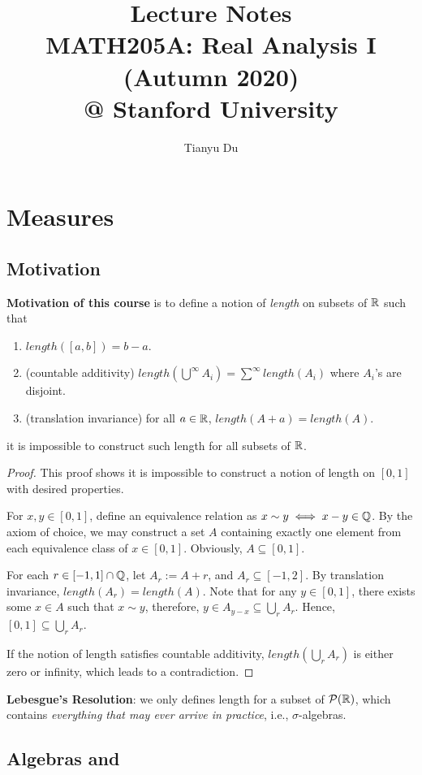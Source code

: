 \documentclass[11pt]{article}
\title{Lecture Notes \\ MATH205A: Real Analysis I (Autumn 2020) \\ @ Stanford University}
\author{Tianyu Du}
\begin{document}
	\maketitle
	\section{Measures}
	\subsection{Motivation}
	\textbf{Motivation of this course} is to define a notion of \emph{length} on subsets of $\mathbb{R}$ such that
	\begin{enumerate}
		\item $length([a,b]) = b - a$.
		\item (countable additivity) $length(\bigcup^\infty A_i) = \sum^\infty length(A_i)$ where $A_i$'s are disjoint.
		\item (translation invariance) for all $a \in \mathbb{R}$, $length(A + a) = length(A)$.
	\end{enumerate}
	\begin{fact} it is impossible to construct such length for all subsets of $\mathbb{R}$.
	\begin{proof}
		This proof shows it is impossible to construct a notion of length on $[0, 1]$ with desired properties.
		
		For $x, y \in [0, 1]$, define an equivalence relation as $x \sim y \iff x - y \in \mathbb{Q}$. By the axiom of choice, we may construct a set $A$ containing exactly one element from each equivalence class of $x \in [0, 1]$. Obviously, $A \subseteq [0, 1]$.
		
		For each $r \in [-1, 1] \cap \mathbb{Q}$, let $A_r := A + r$, and $A_r \subseteq [-1, 2]$.
		By translation invariance, $length(A_r) = length(A)$.
		Note that for any $y \in [0, 1]$, there exists some $x \in A$ such that $x \sim y$, therefore, $y \in A_{y-x} \subseteq \bigcup_r A_r$. Hence, $[0, 1] \subseteq \bigcup_r A_r$.
		
		If the notion of length satisfies countable additivity, $length(\bigcup_r A_r)$ is either zero or infinity, which leads to a contradiction.
	\end{proof}
	\end{fact}
	
	\textbf{Lebesgue's Resolution}: we only defines length for a subset of $\mathcal{{P}}(\mathbb{R})$, which contains \emph{everything that may ever arrive in practice}, i.e., $\sigma$-algebras.
	
	\subsection{Algebras and \salg}
	
\end{document}
